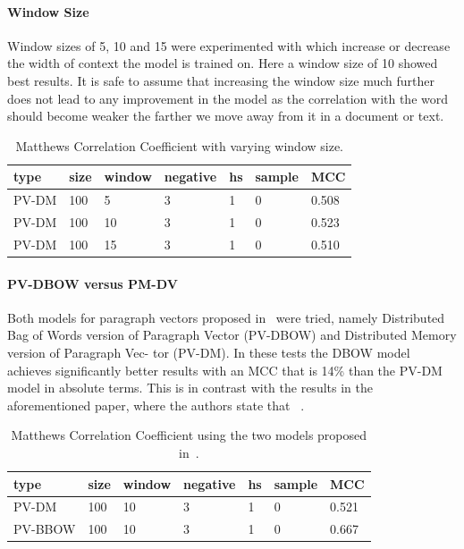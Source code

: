 \paragraph{Window Size}
Window sizes of 5, 10 and 15 were experimented with which increase or decrease the width of context the model is trained on. Here a window size of 10 showed best results. It is safe to assume that increasing the window size much further does not lead to any improvement in the model as the correlation with the word should become weaker the farther we move away from it in a document or text.


\begin{table}[h]
  \begin{center}
  \begin{tabular}{ *6l | l }
    \toprule
    type & size & window & negative & hs & sample & MCC  \\
    \midrule
    PV-DM & 100 & 5 & 3 & 1 & 0 & 0.508 \\
    PV-DM & 100 & 10 & 3 & 1 & 0 & 0.523 \\
    PV-DM & 100 & 15 & 3 & 1 & 0 & 0.510 \\
    \bottomrule
  \end{tabular}
  \caption{Matthews Correlation Coefficient with varying window size.}
\label{tab:Paragraph Vector Parameter Results Hierarchical Softmax}
\end{center}
\end{table}

\paragraph{PV-DBOW versus PM-DV}
Both models for paragraph vectors proposed in~\cite{Le:2014aa} were tried, namely Distributed Bag of Words version of Paragraph Vector (PV-DBOW) and Distributed Memory version of Paragraph Vec- tor (PV-DM). In these tests the DBOW model achieves significantly better results with an MCC that is 14\% than the PV-DM model in absolute terms. This is in contrast with the results in the aforementioned paper, where the authors state that ~\cite{Le:2014aa}.

\begin{table}[h]
  \begin{center}
  \begin{tabular}{ *6l | l }
    \toprule
    type & size & window & negative & hs & sample & MCC  \\
    \midrule
    PV-DM & 100 & 10 & 3 & 1 & 0 & 0.521 \\
    PV-BBOW & 100 & 10 & 3 & 1 & 0 & 0.667 \\
    \bottomrule
  \end{tabular}
  \caption{Matthews Correlation Coefficient using the two models proposed in~\cite{Le:2014aa}.}
\label{tab:Paragraph Vector Parameter Results Hierarchical Softmax}
\end{center}
\end{table}

